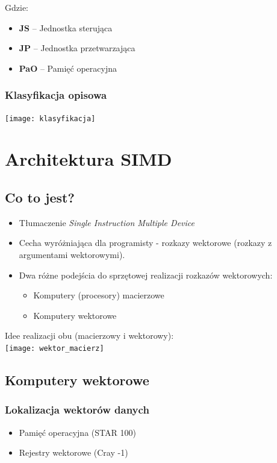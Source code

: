\begin{samepage}
\begin{itemize}
\begin{center}
				\end{center}
			\end{itemize}
			Gdzie:
			\begin{itemize}
				\item \textbf{JS} – Jednostka sterująca
				\item \textbf{JP} – Jednostka przetwarzająca
				\item \textbf{PaO} – Pamięć operacyjna
			\end{itemize}
		\end{samepage}
		\subsubsection{Klasyfikacja opisowa}
			\texttt{[image: klasyfikacja]}
		\vfill
		
\section{Architektura SIMD}
	\begin{samepage}
	\subsection{Co to jest?}
		\begin{itemize}
			\item Tłumaczenie \emph{Single Instruction Multiple Device}
			\item Cecha wyróżniająca dla programisty - rozkazy wektorowe (rozkazy z argumentami wektorowymi).
			\item Dwa różne podejścia do sprzętowej realizacji rozkazów wektorowych:
			\begin{itemize}
				\item Komputery (procesory) macierzowe
				\item Komputery wektorowe
			\end{itemize}
		\end{itemize}
		Idee realizacji obu (macierzowy i wektorowy):\\
		\texttt{[image: wektor\_macierz]}\\
	\end{samepage}
	\subsection{Komputery wektorowe}
	\label{ss:wektor}
		\subsubsection{Lokalizacja wektorów danych}
			\begin{itemize}
				\item Pamięć operacyjna (STAR 100)
				\item Rejestry wektorowe (Cray -1)
			\end{itemize}
